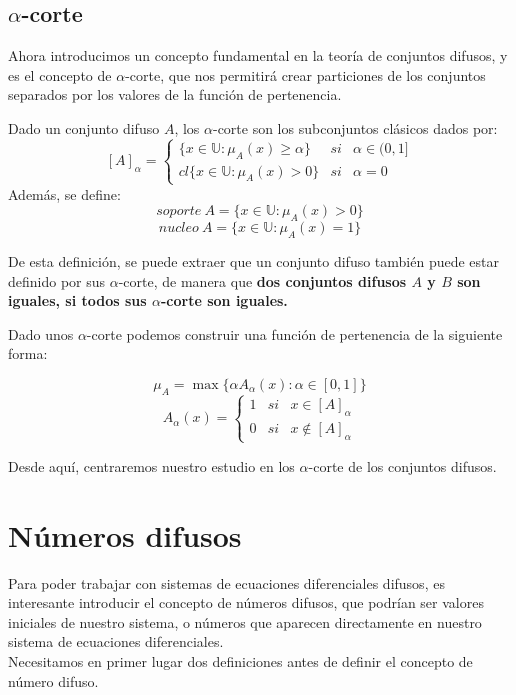 \subsection{$\alpha$-corte}
Ahora introducimos un concepto fundamental en la teoría de conjuntos difusos, y es el concepto de $\alpha$-corte, que nos permitirá crear particiones de los conjuntos separados por los valores de la función de pertenencia.
\begin{definicion}
	Dado un conjunto difuso $A$, los $\alpha$-corte son los subconjuntos clásicos dados por:
	\[
		[A]_\alpha = \left\{
			\begin{array}{ccc}
			\{x \in \mathbb{U} : \mu_A(x) \geq \alpha \} & si & \alpha \in (0, 1] \\
			cl\{x \in \mathbb{U} : \mu_A(x) > 0\} & si & \alpha=0
			\end{array}
		\right.
	\]
	Además, se define:
	\[
		soporte ~ A = \{x \in \mathbb{U} : \mu_A(x) > 0 \}
	\]
	\[
		nucleo ~ A = \{x \in \mathbb{U} : \mu_A(x) = 1 \}
	\]
\end{definicion}
De esta definición, se puede extraer que un conjunto difuso también puede estar definido por sus $\alpha$-corte, de manera que \textbf{dos conjuntos difusos $A$ y $B$ son iguales, si todos sus $\alpha$-corte son iguales.} 

Dado unos $\alpha$-corte podemos construir una función de pertenencia de la siguiente forma: \cite{apuntesfuzzy}

\[
	\mu_A = \max{\{\alpha A_\alpha(x) : \alpha \in [0, 1]}\}
\]
\[
	A_\alpha(x) = \left\{
		\begin{array}{ccc}
			1 & si & x \in [A]_\alpha \\
			0 & si & x \notin [A]_\alpha
		\end{array}
	\right.
\]

Desde aquí, centraremos nuestro estudio en los $\alpha$-corte de los conjuntos difusos.

\section{Números difusos}
Para poder trabajar con sistemas de ecuaciones diferenciales difusos, es interesante introducir el concepto de números difusos, que podrían ser valores iniciales de nuestro sistema, o números que aparecen directamente en nuestro sistema de ecuaciones diferenciales. \\
Necesitamos en primer lugar dos definiciones antes de definir el concepto de número difuso.

